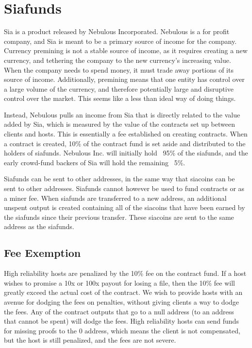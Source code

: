 \documentclass[twocolumn]{article}
\begin{document}
\section{Siafunds}
Sia is a product released by Nebulous Incorporated.
Nebulous is a for profit company, and Sia is meant to be a primary source of income for the company.
Currency premining is not a stable source of income, as it requires creating a new currency, and tethering the company to the new currency's increasing value.
When the company needs to spend money, it must trade away portions of its source of income.
Additionally, premining means that one entity has control over a large volume of the currency, and therefore potentially large and disruptive control over the market.
This seems like a less than ideal way of doing things.

Instead, Nebulous pulls an income from Sia that is directly related to the value added by Sia, which is measured by the value of the contracts set up between clients and hosts.
This is essentially a fee established on creating contracts.
When a contract is created, 10\% of the contract fund is set aside and distributed to the holders of siafunds.
Nebulous Inc. will initially hold ~95\% of the siafunds, and the early crowd-fund backers of Sia will hold the remaining ~5\%.

Siafunds can be sent to other addresses, in the same way that siacoins can be sent to other addresses.
Siafunds cannot however be used to fund contracts or as a miner fee.
When siafunds are transferred to a new address, an additional unspent output is created containing all of the siacoins that have been earned by the siafunds since their previous transfer.
These siacoins are sent to the same address as the siafunds.

\subsection{Fee Exemption}
High reliability hosts are penalized by the 10\% fee on the contract fund.
If a host wishes to promise a 10x or 100x payout for losing a file, then the 10\% fee will greatly exceed the actual cost of the contract.
We wish to provide hosts with an avenue for dodging the fees on penalties, without giving clients a way to dodge the fees.
Any of the contract outputs that go to a null address (to an address that cannot be spent) will dodge the fees.
High reliability hosts can send funds for missing proofs to the 0 address, which means the client is not compensated, but the host is still penalized, and the fees are not severe.
\end{document}
